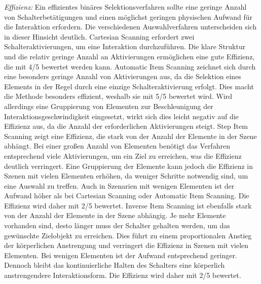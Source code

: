 \textit{Effizienz:}
Ein effizientes binäres Selektionsverfahren sollte eine geringe Anzahl von Schalterbetätigungen und einen möglichst geringen physischen Aufwand für die Interaktion erfordern. Die verschiedenen Auswahlverfahren unterscheiden sich in dieser Hinsicht deutlich. Cartesian Scanning erfordert zwei Schalteraktivierungen, um eine Interaktion durchzuführen. Die klare Struktur und die relativ geringe Anzahl an Aktivierungen ermöglichen eine gute Effizienz, die mit 4/5 bewertet werden kann. Automatic Item Scanning zeichnet sich durch eine besonders geringe Anzahl von Aktivierungen aus, da die Selektion eines Elements in der Regel durch eine einzige Schalteraktivierung erfolgt. Dies macht die Methode besonders effizient, weshalb sie mit 5/5 bewertet wird. Wird allerdings eine Gruppierung von Elementen zur Beschleunigung der Interaktionsgeschwindigkeit eingesetzt, wirkt sich dies leicht negativ auf die Effizienz aus, da die Anzahl der erforderlichen Aktivierungen steigt. Step Item Scanning zeigt eine Effizienz, die stark von der Anzahl der Elemente in der Szene abhängt. Bei einer großen Anzahl von Elementen benötigt das Verfahren entsprechend viele Aktivierungen, um ein Ziel zu erreichen, was die Effizienz deutlich verringert. Eine Gruppierung der Elemente kann jedoch die Effizienz in Szenen mit vielen Elementen erhöhen, da weniger Schritte notwendig sind, um eine Auswahl zu treffen. Auch in Szenarien mit wenigen Elementen ist der Aufwand höher als bei Cartesian Scanning oder Automatic Item Scanning. Die Effizienz wird daher mit 2/5 bewertet. Inverse Item Scanning ist ebenfalls stark von der Anzahl der Elemente in der Szene abhängig. Je mehr Elemente vorhanden sind, desto länger muss der Schalter gehalten werden, um das gewünschte Zielobjekt zu erreichen. Dies führt zu einem proportionalen Anstieg der körperlichen Anstrengung und verringert die Effizienz in Szenen mit vielen Elementen. Bei wenigen Elementen ist der Aufwand entsprechend geringer. Dennoch bleibt das kontinuierliche Halten des Schalters eine körperlich anstrengendere Interaktionsform. Die Effizienz wird daher mit 2/5 bewertet. 

